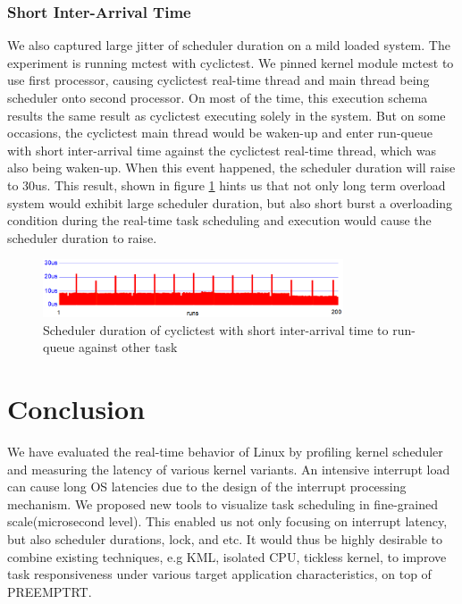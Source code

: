 \documentclass[conference]{IEEEtran}
\begin{document}
\subsubsection{Short Inter-Arrival Time}

    We also captured large jitter of scheduler duration on a mild loaded system. The experiment is running mctest with
    cyclictest. We pinned kernel module mctest to use first processor, causing cyclictest real-time thread and main
    thread being scheduler onto second processor. On most of the time, this execution schema results the same result as
    cyclictest executing solely in the system. But on some occasions, the cyclictest main thread would be waken-up and
    enter run-queue with short inter-arrival time against the cyclictest real-time thread, which was also being
    waken-up. When this event happened, the scheduler duration will raise to 30us. This result, shown in figure
    \ref{fig:sd_mctest} hints us that not only long term overload system would exhibit large scheduler duration, but
    also short burst a overloading condition during the real-time task scheduling and execution would cause the
    scheduler duration to raise.

    \begin{figure} \centering \includegraphics[width=3.5in]{img/sd-mctest.png} \caption{Scheduler duration of cyclictest
    with short inter-arrival time to run-queue against other task} \label{fig:sd_mctest} \end{figure}

\section{Conclusion}

    We have evaluated the real-time behavior of Linux by profiling kernel scheduler and measuring the latency of various
    kernel variants. An intensive interrupt load can cause long OS latencies due to the design of the interrupt
    processing mechanism. We proposed new tools to visualize task scheduling in fine-grained scale(microsecond level).
    This enabled us not only focusing on interrupt latency, but also scheduler durations, lock, and etc. It would thus
    be highly desirable to combine existing techniques, e.g KML, isolated CPU, tickless kernel, to improve task
    responsiveness under various target application characteristics, on top of PREEMPT\textunderscore RT.



\end{document}

